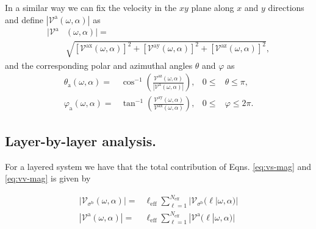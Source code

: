 \documentclass[prb,11pt,tightenlines,twocolumn,aps]{revtex4-1}
\begin{document}
In a similar way we can fix the velocity in the $xy$ plane
along $x$ and $y$ directions and define $|\mathcal{V}^{\mathrm{a}}(\omega,\alpha)|$ as
\begin{align}
|\mathcal{V}^{\mathrm{a}}&(\omega,\alpha)| = \nonumber \\
&\sqrt { 
[\mathcal{V}^{\mathrm{ax}}(\omega,\alpha)]^{2} +
[\mathcal{V}^{\mathrm{ay}}(\omega,\alpha)]^{2} +
[\mathcal{V}^{\mathrm{az}}(\omega,\alpha)]^{2} 
},
\label{eq:vv-mag}
\end{align}
and the corresponding polar and azimuthal angles $\theta$ and $\varphi$ as
\begin{align}
\theta_{\mathrm{a}}  (\omega,\alpha)
=& 
\cos^{-1} \left( \frac{\mathcal{V}^{\mathrm{az}}(\omega,\alpha)}
{|\mathcal{V}^{\mathrm{a}}(\omega,\alpha)|} \right),
& 0 \leq &\theta \leq \pi, 
\label{eq:polar-ang}
\\
\varphi_{\mathrm{a}} (\omega,\alpha)
=& 
\tan^{-1} \left( \frac{\mathcal{V}^{\mathrm{ay}}(\omega,\alpha)}
{\mathcal{V}^{\mathrm{ax}}(\omega,\alpha)} \right),
& 0 \leq &\varphi \leq 2\pi.
\label{eq:azimuthal-ang} 
\end{align}




\subsection{Layer-by-layer analysis.}\label{sec:theory-layer}

For a layered system we have that the total contribution of Eqns. 
\eqref{eq:vs-mag} and \eqref{eq:vv-mag} is given \cite{arzatePRB14} by 

\begin{align}
|\mathcal{V}_{\sigma^{\mathrm{b}}}(\omega,\alpha)|
=& 
\ell_{\mathrm{eff}}
\sum_{\ell=1}^{N_{\mathrm{eff}}}
|\mathcal{V}_{\sigma^{\mathrm{b}}} (\ell | \omega,\alpha)|
\label{eq:vs-layer}
\\
|\mathcal{V}^{\mathrm{a}}(\omega,\alpha)|
=&
\ell_{\mathrm{eff}}
\sum_{\ell=1}^{N_{\mathrm{eff}}}
|\mathcal{V}^{\mathrm{a}} (\ell | \omega,\alpha)|
\label{eq:vv-layer}
\end{align}


\end{document}
